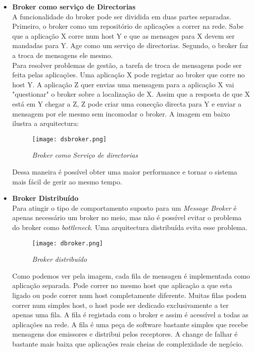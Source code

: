 \begin{itemize}
\item \textbf{Broker como serviço de Directorias} \\
A funcionalidade do broker pode ser dividida em duas partes separadas. Primeiro, o broker como um repositório de aplicações a correr na rede. Sabe que a aplicação X corre num host Y e que as mensages para X devem ser mandadas para Y. Age como um serviço de directorias. Segundo, o broker faz a troca de mensagens ele mesmo.\\
Para resolver problemas de gestão, a tarefa de troca de mensagens pode ser feita pelas aplicações. Uma aplicação X pode registar ao broker que corre no host Y. A aplicação Z quer envias uma mensagem para a aplicação X vai "questionar" o broker sobre a localização de X. Assim que a resposta de que X está em Y chegar a Z, Z pode criar uma conecção directa para Y e enviar a mensagem por ele mesmo sem incomodar o broker. A imagem em baixo ilustra a arquitectura:\\
\begin{figure}[H]
\centering
\texttt{[image: dsbroker.png]}
\caption{\textit{Broker como Serviço de directorias}}
\label{fig:dsbroker}
\end{figure}
Dessa maneira é possível obter uma maior performance e tornar o sistema mais fácil de gerir ao mesmo tempo.
\item \textbf{Broker Distribuído}\\
Para atingir o tipo de comportamento suposto para um \textit{Message Broker} é apenas necessário um broker no meio, mas não é possível evitar o problema do broker como \textit{bottleneck}. Uma arquitectura distribuída evita esse problema.\\
\begin{figure}[H]
\centering
\texttt{[image: dbroker.png]}
\caption{\textit{Broker distribuído}}
\label{fig:distributedbroker}
\end{figure}
Como podemos ver pela imagem, cada fila de mensagen é implementada como aplicação separada. Pode correr no mesmo host que aplicação a que esta ligado ou pode correr num host completamente diferente. Muitas filas podem correr num simples host, o host pode ser dedicado exclusivamente a ter apenas uma fila. A fila é registada com o broker e assim é acessível a todas as aplicações na rede. A fila é uma peça de software bastante simples que recebe mensagens dos emissores e distribui pelos receptores. A change de falhar é bastante mais baixa que aplicações reais cheias de complexidade de negócio.
\end{itemize}


